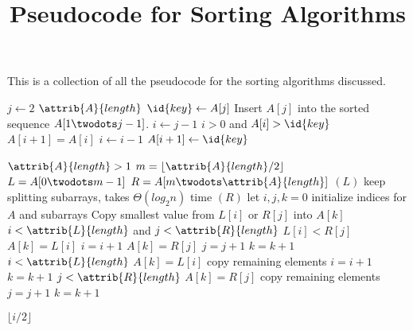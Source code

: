 \documentclass{article}
\title{Pseudocode for Sorting Algorithms}
\author{}
\date{}
\begin{document}
\maketitle

This is a collection of all the pseudocode for the sorting algorithms discussed.

\begin{codebox}
\li \For $j \gets 2$ \To $\attrib{A}{length}$
\li     \Do
            $\id{key} \gets A[j]$
\li         \Comment Insert $A[j]$ into the sorted sequence $A[1 \twodots j-1]$.
\li         $i \gets j-1$
\li         \While $i > 0$ and $A[i] > \id{key}$
\li             \Do
                    $A[i + 1] = A[i]$
\li                 $i \gets i-1$
                \End
\li         $A[i+1] \gets \id{key}$
        \End
\end{codebox}

\begin{codebox}
\li \If $\attrib{A}{length} > 1$
\li \Then
        $m = \lfloor \attrib{A}{length}/2 \rfloor$
\li     $L = A[0 \twodots m-1]$
\li     $R = A[m \twodots \attrib{A}{length}]$
\li     {}$(L)$ \Comment keep splitting subarrays, takes $\Theta{(log_2{n})}$ time
\li     {}$(R)$
\li     let $i, j, k = 0$ \Comment initialize indices for $A$ and subarrays
\li     \Comment Copy smallest value from $L[i]$ or $R[j]$ into $A[k]$
\li     \While $i < \attrib{L}{length}$ and $j < \attrib{R}{length}$
\li     \Do
            \If $L[i] < R[j]$
\li         \Then
                $A[k] = L[i]$
\li             $i = i + 1$
\li         \Else
\li             $A[k] = R[j]$
\li             $j = j + 1$
            \End
\li     $k = k + 1$
        \End
\li     \While $i < \attrib{L}{length}$
\li     \Do
            $A[k] = L[i]$ \Comment copy remaining elements
\li         $i = i + 1$
\li         $k = k + 1$
        \End
\li     \While $j < \attrib{R}{length}$
\li     \Do
            $A[k] = R[j]$ \Comment copy remaining elements
\li         $j = j + 1$
\li         $k = k + 1$
        \End
    \End
\end{codebox}

\newpage

\begin{codebox}
\li \Return $\lfloor i/2 \rfloor$
\end{codebox}
\end{document}
